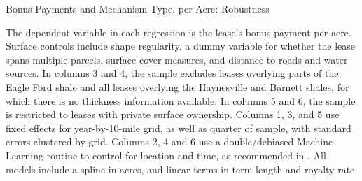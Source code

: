 \documentclass[12pt]{article}
\begin{document}
\begin{appendices}
\begin{table}[H]
	\begin{center}
	\begin{threeparttable}
		\caption{Bonus Payments and Mechanism Type, per Acre: Robustness}
		\label{tab:BonusCondOutput}
		\small
		            
		\begin{tablenotes}
		\footnotesize
		\item The dependent variable in each regression is the lease's bonus payment per acre.  Surface controls include shape regularity, a dummy variable for whether the lease spans multiple parcels, surface cover measures, and distance to roads and water sources.  In columns 3 and 4, the sample excludes leases overlying parts of the Eagle Ford shale and all leases overlying the Haynesville and Barnett shales, for which there is no thickness information available.  In columns 5 and 6, the sample is restricted to leases with private surface ownership.  Columns 1, 3, and 5  use fixed effects for year-by-10-mile grid, as well as quarter of sample, with standard errors clustered by grid.  Columns 2, 4 and 6 use a double/debiased Machine Learning routine to control for location and time, as recommended in \cite{chernozhukov2018double}.  All models include a spline in acres, and linear terms in term length and royalty rate.
		\end{tablenotes}
	\end{threeparttable}
	\end{center}
\end{table}



\end{appendices}
\end{document}
